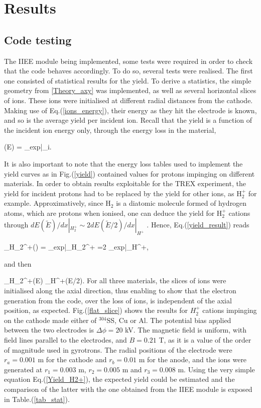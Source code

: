 \section{Results}\label{results}

\subsection{Code testing}\label{CodeTest_section}

The IIEE module being implemented, some tests were required in order to check that the code behaves accordingly. To do so, several tests were realised. The first one consisted of statistical results for the yield. To derive a statistics, the simple geometry from \ref{Theory_axy} was implemented, as well as several horizontal slices of ions. These ions were initialised at different radial distances from the cathode. Making use of Eq.(\ref{ions_energy}), their energy as they hit the electrode is known, and so is the average yield per incident ion. Recall that the yield is a function of the incident ion energy only, through the energy loss in the material,

\beq
\gamma(E) = \Lambda_{exp}\cdot {}\Bigg|_i.\label{yield_result}
\eeq 

\noindent It is also important to note that the energy loss tables used to implement the yield curves as in Fig.(\ref{yield}) contained values for protons impinging on different materials. In order to obtain results exploitable for the TREX experiment, the yield for incident protons had to be replaced by the yield for other ions, as H$_2^{+}$ for example. Approximatively, since H$_{2}$ is a diatomic molecule formed of hydrogen atoms, which are protons when ionised, one can deduce the yield for H$_2^{+}$ cations through $dE(\tilde{E})/dx|_{H_2^{+}} \sim 2dE(\tilde{E}/2)/dx|_{H^{+}}$ \cite{Yield_H2}. Hence, Eq.(\ref{yield_result}) reads 

\beq
\gamma_{H_2^+}() = \Lambda_{exp}\cdot {}\Bigg|_{H_2^+} =2 \Lambda_{exp}\cdot {}\Bigg|_{H^+},
\eeq  

and then 

\beq
\gamma_{H_2^+}(E) \cdot \gamma_{H^+}(E/2). \label{Yield_H2+}
\eeq
\noindent For all three materials, the slices of ions were initialised along the axial direction, thus enabling to show that the electron generation from the code, over the loss of ions, is independent of the axial position, as expected. Fig.(\ref{flat_slice}) shows the results for $H_2^{+}$ cations impinging on the cathode made either of $^{304}$SS, Cu or Al. The potential bias applied between the two electrodes is $\Delta \phi=20$ kV. The magnetic field is uniform, with field lines parallel to the electrodes, and $B=0.21$ T, as it is a value of the order of magnitude used in gyrotrons. The radial positions of the electrode were $r_a=0.001$ m for the cathode and $r_b=0.01$ m for the anode, and the ions were generated at $r_1 = 0.003$ m, $r_2=0.005$ m and $r_3=0.008$ m. Using the very simple equation Eq.(\ref{Yield_H2+}), the expected yield could be estimated and the comparison of the latter with the one obtained from the IIEE module is exposed in Table.(\ref{tab_stat}). 

